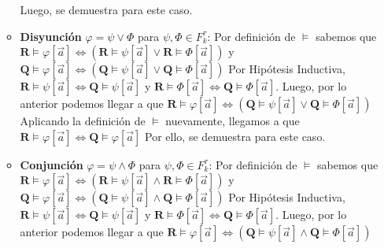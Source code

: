 \documentclass{article}
\begin{document}
\begin{itemize}
\begin{itemize}
                \hspace*{0.5cm} Luego, se demuestra para este caso.
          \item \textbf{Disyunción} $\varphi=\psi\lor\Phi$ para $\psi,\Phi\in F^\tau_k$: \newline
                \hspace*{0.5cm} Por definición de $\vDash$ sabemos que $\mathbf{R}\vDash\varphi[\vec{a}]\iff(\mathbf{R}\vDash\psi[\vec{a}]\lor\mathbf{R}\vDash\Phi[\vec{a}])$ y $\mathbf{Q}\vDash\varphi[\vec{a}]\iff(\mathbf{Q}\vDash\psi[\vec{a}]\lor\mathbf{Q}\vDash\Phi[\vec{a}])$ \newline
                \hspace*{0.5cm} Por Hipótesis Inductiva, $\mathbf{R}\vDash\psi[\vec{a}]\iff\mathbf{Q}\vDash\psi[\vec{a}]$ y $\mathbf{R}\vDash\Phi[\vec{a}]\iff\mathbf{Q}\vDash\Phi[\vec{a}]$. \newline
                \hspace*{0.5cm} Luego, por lo anterior podemos llegar a que $\mathbf{R}\vDash\varphi[\vec{a}]\iff(\mathbf{Q}\vDash\psi[\vec{a}]\lor\mathbf{Q}\vDash\Phi[\vec{a}])$ \newline
                \hspace*{0.5cm} Aplicando la definición de $\vDash$ nuevamente, llegamos a que $\mathbf{R}\vDash\varphi[\vec{a}]\iff\mathbf{Q}\vDash\varphi[\vec{a}]$ \newline
                \hspace*{0.5cm} Por ello, se demuestra para este caso.
          \item \textbf{Conjunción} $\varphi=\psi\wedge\Phi$ para $\psi,\Phi\in F^\tau_k$: \newline
                \hspace*{0.5cm} Por definición de $\vDash$ sabemos que $\mathbf{R}\vDash\varphi[\vec{a}]\iff(\mathbf{R}\vDash\psi[\vec{a}]\land\mathbf{R}\vDash\Phi[\vec{a}])$ y $\mathbf{Q}\vDash\varphi[\vec{a}]\iff(\mathbf{Q}\vDash\psi[\vec{a}]\land\mathbf{Q}\vDash\Phi[\vec{a}])$ \newline
                \hspace*{0.5cm} Por Hipótesis Inductiva, $\mathbf{R}\vDash\psi[\vec{a}]\iff\mathbf{Q}\vDash\psi[\vec{a}]$ y $\mathbf{R}\vDash\Phi[\vec{a}]\iff\mathbf{Q}\vDash\Phi[\vec{a}]$. \newline
                \hspace*{0.5cm} Luego, por lo anterior podemos llegar a que $\mathbf{R}\vDash\varphi[\vec{a}]\iff(\mathbf{Q}\vDash\psi[\vec{a}]\land\mathbf{Q}\vDash\Phi[\vec{a}])$ \newline

\end{itemize}
\end{itemize}
\end{document}
